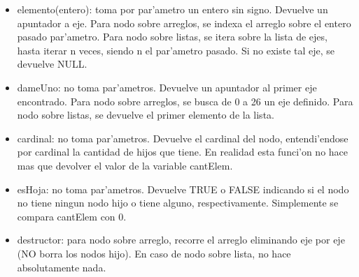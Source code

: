 \begin{itemize}
\item elemento(entero): toma por par'ametro un entero sin signo. Devuelve un apuntador a eje. Para nodo sobre arreglos, se indexa el arreglo sobre el entero pasado par'ametro. Para nodo sobre listas, se itera sobre la lista de ejes, hasta iterar n veces, siendo n el par'ametro pasado. Si no existe tal eje, se devuelve NULL.

\item dameUno: no toma par'ametros. Devuelve un apuntador al primer eje encontrado. Para nodo sobre arreglos, se busca de 0 a 26 un eje definido. Para nodo sobre listas, se devuelve el primer elemento de la lista.

\item cardinal: no toma par'ametros. Devuelve el cardinal del nodo, entendi'endose por cardinal la cantidad de hijos que tiene. En realidad esta funci'on no hace mas que devolver el valor de la variable cantElem.

\item esHoja: no toma par'ametros. Devuelve TRUE o FALSE indicando si el nodo no tiene ningun nodo hijo o tiene alguno, respectivamente. Simplemente se compara cantElem con 0.

\item destructor: para nodo sobre arreglo, recorre el arreglo eliminando eje por eje (NO borra los nodos hijo). En caso de nodo sobre lista, no hace absolutamente nada.
\end{itemize}

